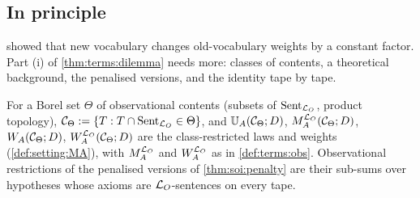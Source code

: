 \subsection{In principle}\label{app:terms:horn}

 showed that new vocabulary changes old-vocabulary weights by a constant factor. Part (i) of \cref{thm:terms:dilemma} needs more: classes of contents, a theoretical background, the penalised versions, and the identity tape by tape.

\begin{definition}\label{def:terms:classes}
For a Borel set $\Theta$ of observational contents (subsets of $\mathrm{Sent}_{\mathcal{L}_{O}}$, product topology), $\mathcal C_\Theta:=\{T:T\cap\mathrm{Sent}_{\mathcal{L}_{O}}\in\Theta\}$, and $\mathbb{U}_{A}(\mathcal C_\Theta;D)$, $M_{A}^{\mathcal{L}_{O}}(\mathcal C_\Theta;D)$, $W_{A}(\mathcal C_\Theta;D)$, $W_{A}^{\mathcal{L}_{O}}(\mathcal C_\Theta;D)$ are the class-restricted laws and weights (\cref{def:setting:MA}), with $M_{A}^{\mathcal{L}_{O}}$ and $W_{A}^{\mathcal{L}_{O}}$ as in \cref{def:terms:obs}. Observational restrictions of the penalised versions of \cref{thm:soi:penalty} are their sub-sums over hypotheses whose axioms are $\mathcal{L}_{O}$-sentences on every tape.
\end{definition}


